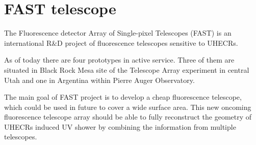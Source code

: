 
\chapter{FAST telescope}
The  Fluorescence  detector  Array  of  Single-pixel  Telescopes  (FAST) is an international R$\&$D project of fluorescence telescopes sensitive to UHECRs. 
\par
As of today there are four prototypes in active service. Three of them are situated in Black Rock Mesa site of the Telescope Array experiment in central Utah and one in Argentina within Pierre Auger Observatory.
\par
The main goal of FAST project is to develop a cheap fluorescence telescope, which could be used in future to cover a wide surface area. This new oncoming fluorescence telescope array should be able  
to fully reconstruct the geometry of UHECRs induced UV shower by combining the information from multiple telescopes.

